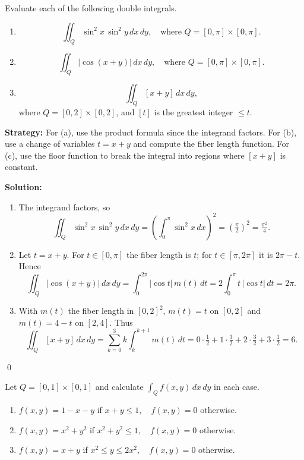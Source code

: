 \begin{problembox}
\begin{problemstatement}
Evaluate each of the following double integrals.
\begin{enumerate}[label=(\alph*)]
    \item \[ \iint_{Q} \sin^2 x \, \sin^2 y \, dx \, dy, \quad \text{where } Q = [0, \pi] \times [0, \pi]. \]
    \item \[ \iint_{Q} |\cos (x + y)| \, dx \, dy, \quad \text{where } Q = [0, \pi] \times [0, \pi]. \]
    \item $$ \iint_{Q} [x + y] \, dx \, dy,$$  where $Q = [0, 2] \times [0, 2]$, and $[t]$  is the greatest integer  $\leq t$.
\end{enumerate}
\end{problemstatement}
\end{problembox}

\noindent\textbf{Strategy:} For (a), use the product formula since the integrand factors. For (b), use a change of variables $t=x+y$ and compute the fiber length function. For (c), use the floor function to break the integral into regions where $[x+y]$ is constant.

\bigskip\noindent\textbf{Solution:}
\begin{enumerate}[label=(\alph*)]
    \item The integrand factors, so
    \[ \iint_Q \sin^2 x\,\sin^2 y\,dx\,dy = \left(\int_0^{\pi} \sin^2 x\,dx\right)^2 = \left(\tfrac{\pi}{2}\right)^2 = \tfrac{\pi^2}{4}. \]
    \item Let $t=x+y$. For $t\in[0,\pi]$ the fiber length is $t$; for $t\in[\pi,2\pi]$ it is $2\pi-t$. Hence
    \[ \iint_Q |\cos(x+y)|\,dx\,dy = \int_0^{2\pi} |\cos t|\,m(t)\,dt = 2\int_0^{\pi} t\,|\cos t|\,dt = 2\pi. \]
    \item With $m(t)$ the fiber length in $[0,2]^2$, $m(t)=t$ on $[0,2]$ and $m(t)=4-t$ on $[2,4]$. Thus
    \[ \iint_Q [x+y]\,dx\,dy = \sum_{k=0}^3 k\int_k^{k+1} m(t)\,dt = 0\cdot\tfrac{1}{2} + 1\cdot\tfrac{3}{2} + 2\cdot\tfrac{3}{2} + 3\cdot\tfrac{1}{2} = 6. \]
\end{enumerate}\qed


\begin{problembox}
\begin{problemstatement}
Let \( Q = [0, 1] \times [0, 1] \) and calculate \( \int_{Q} f(x, y) \, dx \, dy \) in each case.
\begin{enumerate}[label=(\alph*)]
    \item \( f(x, y) = 1 - x - y \) if \( x + y \leq 1, \quad f(x, y) = 0 \) otherwise.
    \item \( f(x, y) = x^2 + y^2 \) if \( x^2 + y^2 \leq 1, \quad f(x, y) = 0 \) otherwise.
    \item \( f(x, y) = x + y \) if \( x^2 \leq y \leq 2x^2, \quad f(x, y) = 0 \) otherwise.
\end{enumerate}
\end{problemstatement}
\end{problembox}

